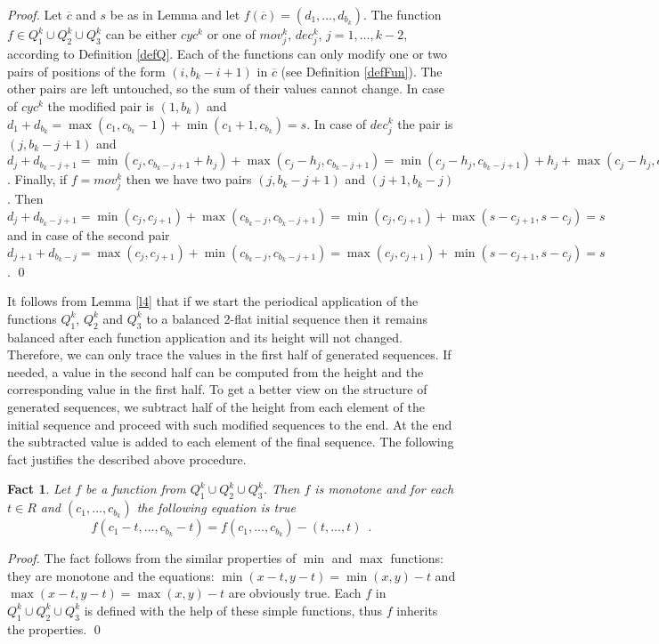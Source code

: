 \documentclass{llncs}
\newtheorem{fact}[theorem]{Fact}
\begin{document}
\begin{proof}
Let $\overline{c}$ and $s$ be as in Lemma and let $f(\overline{c}) =
(d_1,\ldots,d_{b_k})$.  The function $f\in Q^k_1\cup Q^k_2\cup Q^k_3$
can be either $cyc^k$ or one of $mov^k_j$, $dec^k_j$, $j=1,\ldots,k-2$,
according to Definition \ref{defQ}. Each of the functions can only
modify one or two pairs of positions of the form $(i,b_k-i+1)$ in
$\overline{c}$ (see Definition \ref{defFun}). The other pairs are left
untouched, so the sum of their values cannot change. In case of $cyc^k$
the modified pair is $(1,b_k)$ and $d_1+d_{b_k} = \max(c_1,c_{b_k}-1) +
\min(c_1+1,c_{b_k}) = s$. In case of $dec^k_j$ the pair is $(j,b_k-j+1)$
and $ d_j+d_{b_k-j+1} = \min(c_j,c_{b_k-j+1}+h_j) +
\max(c_j-h_j,c_{b_k-j+1}) = \min(c_j-h_j,c_{b_k-j+1}) + h_j +
\max(c_j-h_j,c_{b_k-j+1}) = s$.  Finally, if $f=mov^k_j$ then we have
two pairs $(j,b_k-j+1)$ and $(j+1,b_k-j)$. Then $ d_j+d_{b_k-j+1} =
\min(c_j,c_{j+1}) + \max(c_{b_k-j},c_{b_k-j+1}) = \min(c_j,c_{j+1}) +
\max(s-c_{j+1},s-c_j) = s$ and in case of the second pair
$d_{j+1}+d_{b_k-j} = \max(c_j,c_{j+1}) + \min(c_{b_k-j}, c_{b_k-j+1}) =
\max(c_j,c_{j+1}) + \min(s-c_{j+1},s-c_j) = s$. \qed
\end{proof}

It follows from Lemma \ref{l4} that if we start the periodical
application of the functions $Q^k_1$, $Q^k_2$ and $Q^k_3$ to a balanced
2-flat initial sequence then it remains balanced after each function
application and its height will not changed. Therefore, we can only
trace the values in the first half of generated sequences. If needed, a
value in the second half can be computed from the height and the
corresponding value in the first half. To get a better view on the
structure of generated sequences, we subtract half of the height from
each element of the initial sequence and proceed with such modified
sequences to the end. At the end the subtracted value is added to each
element of the final sequence. The following fact justifies the described
above procedure.

\begin{fact}\label{fct-10}
Let $f$ be a function from $Q^k_1\cup Q^k_2\cup Q^k_3$. Then $f$ is
monotone and for each $t\in R$ and $(c_1,\ldots,c_{b_k})$ the following
equation is true
$$ f(c_1-t,\ldots,c_{b_k}-t) =  f(c_1,\ldots,c_{b_k}) - (t,\ldots,t) \enspace .$$
\end{fact}

\begin{proof}
The fact follows from the similar properties of $\min$ and $\max$
functions: they are monotone and the equations: $\min(x-t,y-t) =
\min(x,y)-t$ and $\max(x-t,y-t) = \max(x,y)-t$ are obviously true. Each
$f$ in $Q^k_1\cup Q^k_2\cup Q^k_3$ is defined with the help of these
simple functions, thus $f$ inherits the properties. \qed
\end{proof}
\end{document}
